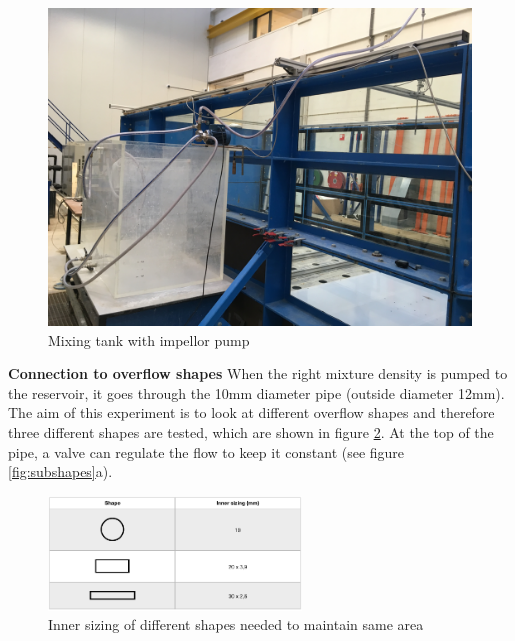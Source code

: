 \begin{figure}[ht!]
  \centering
  \includegraphics[width=\linewidth]{Images/Mixing_Tank.png}
  \caption{Mixing tank with impellor pump}
  \label{subfig:mixing_tank}
\end{figure}



\newpage
\noindent\textbf{Connection to overflow shapes} \newline
\noindent When the right mixture density is pumped to the reservoir, it goes through the 10mm diameter pipe (outside diameter 12mm). The aim of this experiment is to look at different overflow shapes and therefore three different shapes are tested, which are shown in figure \ref{fig:inner_sizing_overflow}. At the top of the pipe, a valve can regulate the flow to keep it constant (see figure \ref{fig:subshapes}a). 


\begin{figure}[ht!]
    \centering
    \includegraphics[width=0.6\textwidth]{Images/Inner_sizing_overflow.png}
    \caption{Inner sizing of different shapes needed to maintain same area}
    \label{fig:inner_sizing_overflow}
\end{figure}


